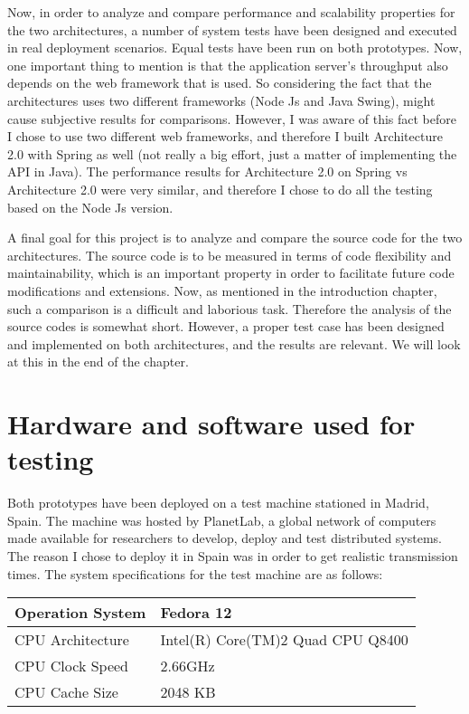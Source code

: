 Now, in order to analyze and compare performance and scalability properties for the two architectures, a number of system tests have been designed and executed in real deployment scenarios. Equal tests have been run on both prototypes. Now, one important thing to mention is that the application server's throughput also depends on the web framework that is used. So considering the fact that the architectures uses two different frameworks (Node Js and Java Swing), might cause subjective results for comparisons. However, I was aware of this fact before I chose to use two different web frameworks, and therefore I  built Architecture 2.0 with Spring as well (not really a big effort, just a matter of implementing the API in Java). The performance results for Architecture 2.0 on Spring vs Architecture 2.0 were very similar, and therefore I chose to do all the testing based on the Node Js version.

A final goal for this project is to analyze and compare the source code for the two architectures. The source code is to be measured in terms of code flexibility and maintainability, which is an important property in order to facilitate future code modifications and extensions. Now, as mentioned in the introduction chapter, such a comparison is a difficult and laborious task. Therefore the analysis of the source codes is somewhat short. However, a proper test case has been designed and implemented on both architectures, and the results are relevant. We will look at this in the end of the chapter.

\section{Hardware and software used for testing}
Both prototypes have been deployed on a test machine stationed in Madrid, Spain. The machine was hosted by PlanetLab, a global network of computers made available for researchers to develop, deploy and test distributed systems. The reason I chose to deploy it in Spain was in order to get realistic transmission times. The system specifications for the test machine are as follows: 

%
\begin{tabularx}{\textwidth}{ | l | R | }
  \hline
  Operation System & Fedora 12  \\ \hline
  CPU Architecture & Intel(R) Core(TM)2 Quad CPU Q8400 \\ \hline
  CPU Clock Speed & 2.66GHz \\ \hline
  CPU Cache Size & 2048 KB \\ \hline  
\end{tabularx}

